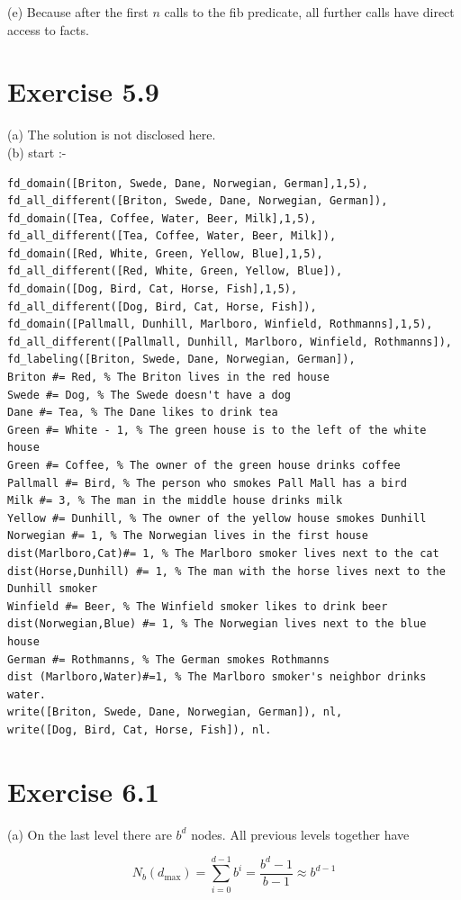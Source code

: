 \documentclass[10pt]{book}
\begin{document}
(e) Because after the first $n$ calls to the fib predicate, all further calls have direct access to facts.

\section{Exercise 5.9}
(a) The solution is not disclosed here.\\
(b) start :-

\begin{verbatim}
fd_domain([Briton, Swede, Dane, Norwegian, German],1,5),
fd_all_different([Briton, Swede, Dane, Norwegian, German]),
fd_domain([Tea, Coffee, Water, Beer, Milk],1,5),
fd_all_different([Tea, Coffee, Water, Beer, Milk]),
fd_domain([Red, White, Green, Yellow, Blue],1,5),
fd_all_different([Red, White, Green, Yellow, Blue]),
fd_domain([Dog, Bird, Cat, Horse, Fish],1,5),
fd_all_different([Dog, Bird, Cat, Horse, Fish]),
fd_domain([Pallmall, Dunhill, Marlboro, Winfield, Rothmanns],1,5),
fd_all_different([Pallmall, Dunhill, Marlboro, Winfield, Rothmanns]),
fd_labeling([Briton, Swede, Dane, Norwegian, German]),
Briton #= Red, % The Briton lives in the red house
Swede #= Dog, % The Swede doesn't have a dog
Dane #= Tea, % The Dane likes to drink tea
Green #= White - 1, % The green house is to the left of the white house
Green #= Coffee, % The owner of the green house drinks coffee
Pallmall #= Bird, % The person who smokes Pall Mall has a bird
Milk #= 3, % The man in the middle house drinks milk
Yellow #= Dunhill, % The owner of the yellow house smokes Dunhill
Norwegian #= 1, % The Norwegian lives in the first house
dist(Marlboro,Cat)#= 1, % The Marlboro smoker lives next to the cat
dist(Horse,Dunhill) #= 1, % The man with the horse lives next to the Dunhill smoker
Winfield #= Beer, % The Winfield smoker likes to drink beer
dist(Norwegian,Blue) #= 1, % The Norwegian lives next to the blue house
German #= Rothmanns, % The German smokes Rothmanns
dist (Marlboro,Water)#=1, % The Marlboro smoker's neighbor drinks water.
write([Briton, Swede, Dane, Norwegian, German]), nl,
write([Dog, Bird, Cat, Horse, Fish]), nl.
\end{verbatim}

\section{Exercise 6.1}
(a) On the last level there are $b^{d}$ nodes. All previous levels together have

$$
N_{b}\left(d_{\max }\right)=\sum_{i=0}^{d-1} b^{i}=\frac{b^{d}-1}{b-1} \approx b^{d-1}
$$
\end{document}
